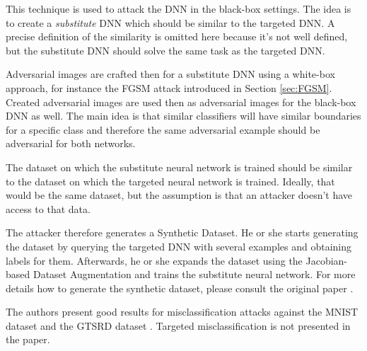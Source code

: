 This technique is used to attack the DNN in the black-box settings. The idea is to create a \textit{substitute} DNN which should be similar to the targeted DNN. A precise definition of the similarity is omitted here because it's not well defined, but the substitute DNN should solve the same task as the targeted DNN.

Adversarial images are crafted then for a substitute DNN using a white-box approach, for instance the FGSM attack introduced in Section \ref{sec:FGSM}. Created adversarial images are used then as adversarial images for the black-box DNN as well. The main idea is that similar classifiers will have similar boundaries for a specific class and therefore the same adversarial example should be adversarial for both networks. 

The dataset on which the substitute neural network is trained should be similar to the dataset on which the targeted neural network is trained. Ideally, that would be the same dataset, but the assumption is that an attacker doesn't have access to that data. 

The attacker therefore generates a Synthetic Dataset. He or she starts generating the dataset by querying the targeted DNN with several examples and obtaining labels for them. Afterwards, he or she expands the dataset using the Jacobian-based Dataset Augmentation and trains the substitute neural network. For more details how to generate the synthetic dataset, please consult the original paper  \cite{DBLP:journals/corr/PapernotMGJCS16}.

The authors present good results for misclassification attacks against the MNIST dataset and the GTSRD dataset \cite{datasetGTSRD}. Targeted misclassification is not presented in the paper.